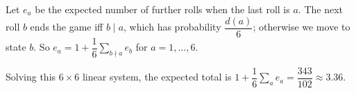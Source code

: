 Let $e_a$ be the expected number of further rolls when the last roll is $a$. The next roll $b$ ends the game iff $b\mid a$, which has probability $\dfrac{d(a)}6$; otherwise we move to state $b$. So $e_a=1+\dfrac16\sum_{b\nmid a}e_b$ for $a=1,\dots,6$.

Solving this $6\times6$ linear system, the expected total is $1+\dfrac16\sum_ae_a=\boxed{\dfrac{343}{102}}\approx3.36$.
